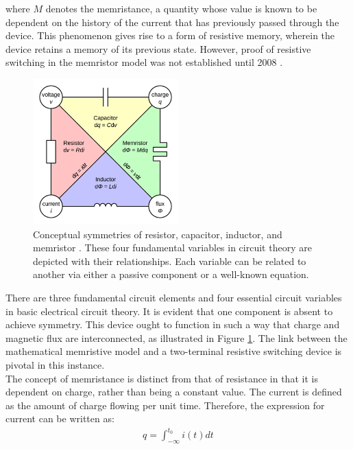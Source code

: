 \noindent where $M$ denotes the memristance, a quantity whose value is known to be dependent on the history of the current that has previously passed through the device. This phenomenon gives rise to a form of resistive memory, wherein the device retains a memory of its previous state. However, proof of resistive switching in the memristor model was not established until 2008 \cite{strukov2008missing}.

\begin{figure}[htbp!] 
    \centering    
    \includegraphics[width=0.5\textwidth]{Chapter2/Figs/e.png}
    \caption[Conceptual symmetries of resistor, capacitor, inductor, and memristor]{Conceptual symmetries of resistor, capacitor, inductor, and memristor \cite{du2017metal}. These four fundamental variables in circuit theory are depicted with their relationships. Each variable can be related to another via either a passive component or a well-known equation.}
    \label{fig:2e}
\end{figure}

\noindent There are three fundamental circuit elements and four essential circuit variables in basic electrical circuit theory.  It is evident that one component is absent to achieve symmetry. This device ought to function in such a way that charge and magnetic flux are interconnected, as illustrated in Figure \ref{fig:2e}. The link between the mathematical memristive model and a two-terminal resistive switching device is pivotal in this instance. \\

\noindent The concept of memristance is distinct from that of resistance in that it is dependent on charge, rather than being a constant value.  The current is defined as the amount of charge flowing per unit time. Therefore, the expression for current can be written as:
\begin{align}
    q = \int_{-\infty}^{t_0} i(t)dt \label{eq:2.23}
\end{align}

